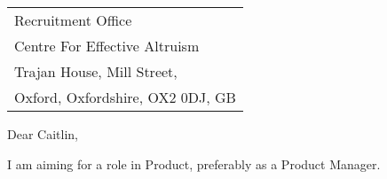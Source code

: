 \begin{tabular}{@{} l}
    Recruitment Office \\
	Centre For Effective Altruism \\
	Trajan House, Mill Street,  \\
	Oxford, Oxfordshire, OX2 0DJ, GB
\end{tabular}

\bigskip %


Dear Caitlin,
\bigskip %


I am aiming for a role in Product, preferably as a Product Manager.
% 

